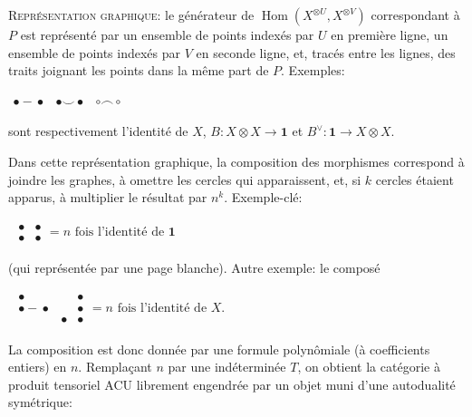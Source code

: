 \documentclass[11pt,a4paper]{article}
\theoremstyle{plain}
\theoremstyle{definition}
\DeclareMathOperator{\Hom}{Hom}
\begin{document}
\textsc{Repr\'esentation graphique}: le g\'en\'erateur de $\Hom(X^{\otimes U}, X^{\otimes V})$ correspondant \`a $P$ est repr\'esent\'e par un ensemble de points index\'es par $U$ en premi\`ere ligne, un ensemble de points index\'es par $V$ en seconde ligne, et, trac\'es entre les lignes, des traits joignant les points dans la m\^eme part de $P$. Exemples:

\begin{center}
$\begin{array}{ccc}
\bullet\!\!\!-\!\!\!\bullet & \bullet\!\!\!\smile\!\!\!\bullet & \circ\!\!\!\frown\!\!\!\circ
\end{array}$
\end{center}

sont respectivement l'identit\'e de $X$, $B : X \otimes X \to \mathbf{1}$ et $B^\vee : \mathbf{1} \to X \otimes X$.

Dans cette repr\'esentation graphique, la composition des morphismes correspond \`a joindre les graphes, \`a omettre les cercles qui apparaissent, et, si $k$ cercles \'etaient apparus, \`a multiplier le r\'esultat par $n^k$. Exemple-cl\'e:

\begin{center}
$\begin{array}{c}
\begin{array}{ccc}
\bullet & \bullet \\
\bullet & \bullet
\end{array}
= n \text{ fois l'identit\'e de } \mathbf{1}
\end{array}$
\end{center}
(qui repr\'esent\'ee par une page blanche). Autre exemple: le compos\'e

\begin{center}
$\begin{array}{c}
\begin{array}{ccc}
\bullet & & \bullet \\
\bullet\!\!\!-\!\!\!\bullet & & \bullet \\
& \bullet & \bullet
\end{array}
= n \text{ fois l'identit\'e de } X.
\end{array}$
\end{center}

La composition est donc donn\'ee par une formule polyn\^omiale (\`a coefficients entiers) en $n$. Rempla\c{c}ant $n$ par une ind\'etermin\'ee $T$, on obtient la cat\'egorie \`a produit tensoriel ACU librement engendr\'ee par un objet muni d'une autodualit\'e sym\'etrique:
\end{document}
